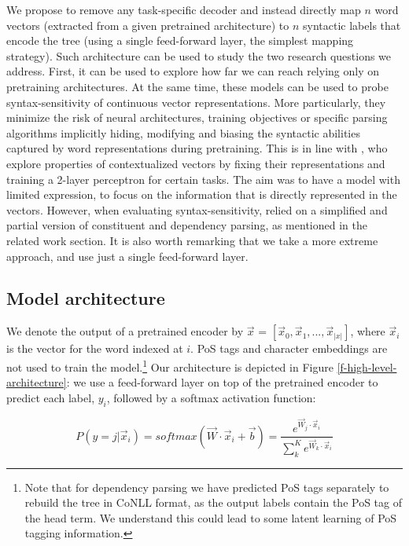 \documentclass[letterpaper]{article} %
\newcommand{\citet}[1]{\citeauthor{#1} \shortcite{#1}}
\begin{document}
We propose to remove any task-specific decoder and instead directly map $n$ word vectors (extracted from a given pretrained architecture) to $n$ syntactic labels that encode the tree (using a single feed-forward layer, the simplest mapping strategy). Such architecture can be used to study the two research questions we address. First, it can be used to explore how far we can reach relying only on pretraining architectures. At the same time, these models can be used to probe syntax-sensitivity of continuous vector representations. More particularly, they minimize the risk of neural architectures, training objectives or specific parsing algorithms implicitly hiding, modifying and biasing the syntactic abilities captured by word representations during pretraining.
This is in line with \citet{tenney2018you}, who explore properties of contextualized 
vectors by fixing their representations and training a 2-layer perceptron for certain tasks. The aim was to have a model with limited expression, to focus on the information that is directly represented in the vectors. However, when evaluating syntax-sensitivity, \citeauthor{tenney2018you} relied on a simplified and partial version of constituent and dependency parsing, as mentioned in the related work section.
It is also worth remarking that we take a more extreme approach, and use just a single feed-forward layer. 


\subsection{Model architecture}\label{section-models}
We denote the output of a pretrained encoder by $\vec{x}$ = $[\vec{x}_0,\vec{x}_1,...,\vec{x}_{|x|}]$, where $\vec{x}_i$ is the vector for the word indexed at $i$. PoS tags and character embeddings are not used to train the model.\footnote{Note that for dependency parsing we have predicted PoS tags separately to rebuild the tree in CoNLL format, as the output labels contain the PoS tag of the head term. We understand this could lead to some latent learning of PoS tagging information.}
Our architecture is depicted in Figure \ref{f-high-level-architecture}: we use a feed-forward layer
on top of the pretrained encoder to predict each label, $y_i$, followed by a softmax activation function:

\begin{equation}
P(y=j|\vec{x}_i) = \mathit{softmax}(\vec{W} \cdot \vec{x}_i + \vec{b}) = \frac{e^{\vec{W}_j \cdot \vec{x}_i}}{\sum_{k}^{K}{e^{\vec{W}_k \cdot \vec{x}_i}}}
\end{equation}
\end{document}
